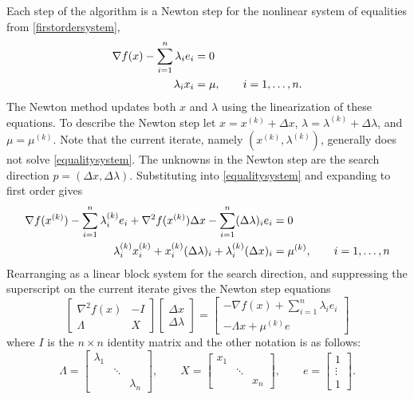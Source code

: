 \documentclass[11pt]{article}
\newcommand{\grad}{\nabla}
\begin{document}
Each step of the algorithm is a Newton step for the nonlinear system of equalities from \eqref{firstordersystem},
\begin{align}
\grad f(x) - \sum_{i=1}^n \lambda_i e_i &= 0 \label{equalitysystem} \\
\lambda_i x_i &= \mu, \qquad i=1,\dots,n. \notag
\end{align}
The Newton method updates both $x$ and $\lambda$ using the linearization of these equations.  To describe the Newton step let $x=x^{(k)}+\Delta x$, $\lambda=\lambda^{(k)}+\Delta\lambda$, and $\mu=\mu^{(k)}$.  Note that the current iterate, namely $(x^{(k)},\lambda^{(k)})$, generally does not solve \eqref{equalitysystem}.  The unknowns in the Newton step are the search direction $p=(\Delta x,\Delta \lambda)$.  Substituting into \eqref{equalitysystem} and expanding to first order gives
\begin{align}
\grad f(x^{(k)}) - \sum_{i=1}^n \lambda_i^{(k)} e_i + \grad^2 f(x^{(k)}) \Delta x - \sum_{i=1}^n (\Delta \lambda)_i e_i &= 0 \label{prenewtonstep} \\
\lambda_i^{(k)} x_i^{(k)} + x_i^{(k)} (\Delta\lambda)_i + \lambda_i^{(k)} (\Delta x)_i &= \mu^{(k)}, \qquad i=1,\dots,n \notag
\end{align}
Rearranging as a linear block system for the search direction, and suppressing the superscript on the current iterate gives the Newton step equations
\begin{equation}
\begin{bmatrix}
\grad^2 f(x) & - I \\
\Lambda & X
\end{bmatrix}
\begin{bmatrix}
\Delta x \\
\Delta \lambda
\end{bmatrix}
=
\begin{bmatrix}
-\grad f(x) + \sum_{i=1}^n \lambda_i e_i \\
-\Lambda x + \mu^{(k)} e
\end{bmatrix}
 \label{newtonstep}
\end{equation}
where $I$ is the $n\times n$ identity matrix and the other notation is as follows:
    $$\Lambda = \begin{bmatrix} \lambda_1 & & \\ & \ddots & \\ & & \lambda_n \end{bmatrix}, \qquad X = \begin{bmatrix} x_1 & & \\ & \ddots & \\ & & x_n \end{bmatrix}, \qquad e = \begin{bmatrix} 1 \\ \vdots \\ 1 \end{bmatrix}.$$
\end{document}
